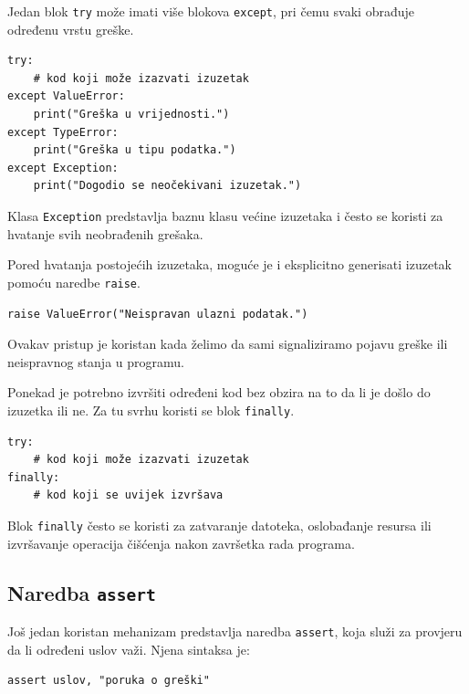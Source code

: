 Jedan blok \texttt{try} može imati više blokova \texttt{except}, pri čemu svaki obrađuje određenu vrstu greške.

\begin{verbatim}
try:
    # kod koji može izazvati izuzetak
except ValueError:
    print("Greška u vrijednosti.")
except TypeError:
    print("Greška u tipu podatka.")
except Exception:
    print("Dogodio se neočekivani izuzetak.")
\end{verbatim}

Klasa \texttt{Exception} predstavlja baznu klasu većine izuzetaka i često se koristi za hvatanje svih neobrađenih grešaka.


Pored hvatanja postojećih izuzetaka, moguće je i eksplicitno generisati izuzetak pomoću naredbe \texttt{raise}.

\begin{verbatim}
raise ValueError("Neispravan ulazni podatak.")
\end{verbatim}

Ovakav pristup je koristan kada želimo da sami signaliziramo pojavu greške ili neispravnog stanja u programu.


Ponekad je potrebno izvršiti određeni kod bez obzira na to da li je došlo do izuzetka ili ne. Za tu svrhu koristi se blok \texttt{finally}.

\begin{verbatim}
try:
    # kod koji može izazvati izuzetak
finally:
    # kod koji se uvijek izvršava
\end{verbatim}

Blok \texttt{finally} često se koristi za zatvaranje datoteka, oslobađanje resursa ili izvršavanje operacija čišćenja nakon završetka rada programa.

\subsection{Naredba \texttt{assert}}

Još jedan koristan mehanizam predstavlja naredba \texttt{assert}, koja služi za provjeru da li određeni uslov važi.  Njena sintaksa je:
\begin{verbatim}
assert uslov, "poruka o greški"
\end{verbatim}

